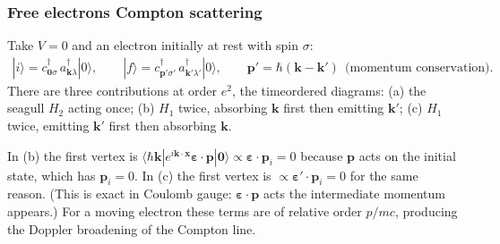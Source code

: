 \documentclass[letterpaper,10pt,english]{jupyterBook}
\begin{document}
\sphinxstepscope


\subsubsection{Free electrons \sphinxhyphen{} Compton scattering}
\label{\detokenize{ch/quantum-mechanics/qft/interactions-e-em-fields-compton:free-electrons-compton-scattering}}\label{\detokenize{ch/quantum-mechanics/qft/interactions-e-em-fields-compton:quantum-mechanics-qft-interactions-e-em-fields-compton-scattering}}\label{\detokenize{ch/quantum-mechanics/qft/interactions-e-em-fields-compton::doc}}
\sphinxAtStartPar
{} Take \(V=0\) and an electron initially at rest with spin \(\sigma\):
\begin{equation*}
\begin{split}
|i\rangle=c^\dagger_{\mathbf 0\sigma}\,a^\dagger_{\mathbf k\lambda}|0\rangle,\qquad|f\rangle=c^\dagger_{\mathbf p'\sigma'}\,a^\dagger_{\mathbf k'\lambda'}|0\rangle,\qquad\mathbf p'=\hbar(\mathbf k-\mathbf k')\ \ \text{(momentum conservation)}.
\end{split}
\end{equation*}
\sphinxAtStartPar
There are three contributions at order \(e^2\), the time\sphinxhyphen{}ordered diagrams: (a) the seagull \(H_2\) acting once; (b) \(H_1\) twice, absorbing \(\mathbf k\) first then emitting \(\mathbf k'\); (c) \(H_1\) twice, emitting \(\mathbf k'\) first then absorbing \(\mathbf k\).

\sphinxAtStartPar
{} In (b) the first vertex is \(\langle\hbar\mathbf k|e^{i\mathbf k\cdot\mathbf x}\boldsymbol\varepsilon\!\cdot\!\mathbf p|\mathbf 0\rangle\propto\boldsymbol\varepsilon\!\cdot\!\mathbf p_i=0\) because \(\mathbf p\) acts on the initial state, which has \(\mathbf p_i=0\). In (c) the first vertex is \(\propto\boldsymbol\varepsilon'\!\cdot\!\mathbf p_i=0\) for the same reason. (This is exact in Coulomb gauge: \(\boldsymbol\varepsilon\!\cdot\!\mathbf p\) acts  the intermediate momentum appears.) For a moving electron these terms are of relative order \(p/mc\), producing the Doppler broadening of the Compton line.
\end{document}
